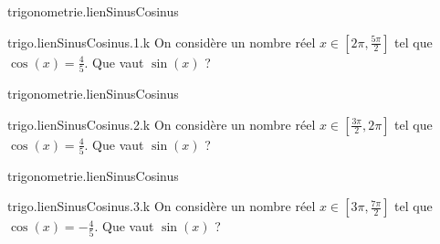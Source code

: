\begin{qcm}{trigonometrie.lienSinusCosinus}
    \begin{question}{trigo.lienSinusCosinus.1.k}
         On considère un nombre réel \(x\in\left[2\pi,\frac{5\pi}{2}\right]\) tel que \(\cos(x)=\frac{4}{5}\). Que vaut \(\sin(x)\) ?
         \vspace{-1.5ex}
         \begin{multicols}{4}
         \begin{reponses}
         \end{reponses}
        \end{multicols}
    \end{question}
\end{qcm}

\begin{qcm}{trigonometrie.lienSinusCosinus}
    \begin{question}{trigo.lienSinusCosinus.2.k}
         On considère un nombre réel \(x\in\left[\frac{3\pi}{2},2\pi\right]\) tel que \(\cos(x)=\frac{4}{5}\). Que vaut \(\sin(x)\) ?
         \vspace{-1.5ex}
         \begin{multicols}{4}
         \begin{reponses}
         \end{reponses}
        \end{multicols}
    \end{question}
\end{qcm}

\begin{qcm}{trigonometrie.lienSinusCosinus}
    \begin{question}{trigo.lienSinusCosinus.3.k}
         On considère un nombre réel \(x\in\left[3\pi,\frac{7\pi}{2}\right]\) tel que \(\cos(x)=-\frac{4}{5}\). Que vaut \(\sin(x)\) ?
         \vspace{-1.5ex}
         \begin{multicols}{4}
         \begin{reponses}
         \end{reponses}
        \end{multicols}
    \end{question}
\end{qcm}

